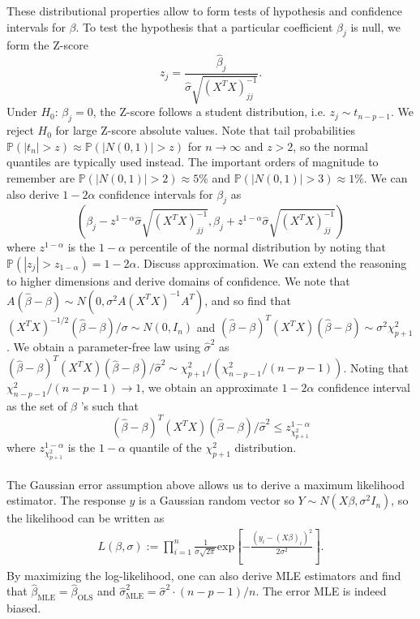\documentclass[]{article}
\begin{document}
\noindent These distributional properties allow to form tests of hypothesis and confidence intervals for $\beta$. To test the hypothesis that a particular coefficient $\beta_j$ is null, we form the Z-score
\begin{equation}
z_j = \frac{\hat{\beta}_j}{\hat{\sigma}\sqrt{(X^TX)^{-1}_{jj}}}.
\end{equation}
Under $H_0$: $\beta_j=0$, the Z-score follows a student distribution, i.e. $z_j\sim t_{n-p-1}$. We reject $H_0$ for large Z-score absolute values. Note that tail probabilities $\mathbb{P}(|t_n|>z)\approx\mathbb{P}(|N(0,1)|>z)$ for $n \to \infty$ and $z>2$, so the normal quantiles are typically used instead. The important orders of magnitude to remember are $\mathbb{P}(|N(0,1)|>2)\approx 5\%$ and $\mathbb{P}(|N(0,1)|>3)\approx 1\%$. We can also derive $1-2\alpha$ confidence intervals for $\beta_j$ as
\begin{equation}
\left(\beta_j-z^{1-\alpha}\hat{\sigma}\sqrt{(X^TX)^{-1}_{jj}}, \beta_j+z^{1-\alpha}\hat{\sigma}\sqrt{(X^TX)^{-1}_{jj}}\right)
\end{equation}
where $z^{1-\alpha}$ is the $1-\alpha$ percentile of the normal distribution by noting that $\mathbb{P}(|z_j|>z_{1-\alpha})=1-2\alpha$. Discuss approximation. We can extend the reasoning to higher dimensions and derive domains of confidence. We note that $A(\hat{\beta}-\beta)\sim N(0, \sigma^2 A (X^TX)^{-1} A^T)$, and so find that $(X^TX)^{-1/2}(\hat{\beta}-\beta)/\sigma\sim N(0, I_n)$ and $(\hat{\beta}-\beta)^T(X^TX)(\hat{\beta}-\beta)\sim\sigma^2 \chi^2_{p+1}$. We obtain a parameter-free law using $\hat{\sigma}^2$ as $(\hat{\beta}-\beta)^T(X^TX)(\hat{\beta}-\beta)/\hat{\sigma}^2\sim \chi^2_{p+1}/(\chi^2_{n-p-1}/(n-p-1))$. Noting that $\chi^2_{n-p-1}/(n-p-1)\rightarrow 1$, we obtain an approximate $1-2\alpha$ confidence interval as the set of $\beta$ 's such that
\begin{equation}
(\hat{\beta}-\beta)^T(X^TX)(\hat{\beta}-\beta)/\hat{\sigma}^2 \leq z_{\chi^2_{p+1}}^{1-\alpha}
\end{equation}
where $z_{\chi^2_{p+1}}^{1-\alpha}$ is the $1-\alpha$ quantile of the $\chi^2_{p+1}$ distribution. \\ \\
\noindent The Gaussian error assumption above allows us to derive a maximum likelihood estimator. The response $y$ is a Gaussian random vector so $Y\sim N(X\beta,\sigma^2I_n)$, so the likelihood can be written as
\begin{eqnarray}
L(\beta, \sigma):=\prod_{i=1}^n \frac{1}{\sigma\sqrt{2\pi}}\mathrm{exp} \left[-\frac{\left(y_i-(X\beta)_i\right)^2}{2\sigma^2}\right].
\end{eqnarray}
By maximizing the log-likelihood, one can also derive MLE estimators and find that $\hat{\beta}_{\mathrm{MLE}}=\hat{\beta}_{\mathrm{OLS}}$ and $\hat{\sigma}^2_{\mathrm{MLE}}=\hat{\sigma}^2\cdot(n-p-1)/n$. The error MLE is indeed biased.
\end{document}

